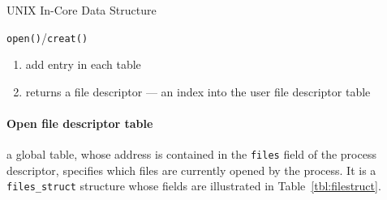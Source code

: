 \begin{frame}{UNIX In-Core Data Structure}
  \begin{center}
  \end{center}
  \begin{block}{\texttt{open()}/\texttt{creat()}}
    \begin{enumerate}
    \item add entry in each table
    \item returns a \alert{file descriptor} --- an index into the user file descriptor table
    \end{enumerate}
  \end{block}
\end{frame}

\paragraph{Open file descriptor table}

a global table, whose address is contained in the \texttt{files} field of the process
descriptor, specifies which files are currently opened by the process. It is a
\texttt{files\_struct} structure whose fields are illustrated in
Table~\ref{tbl:filestruct}.

